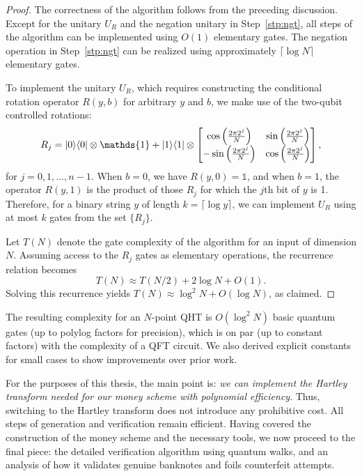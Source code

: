 \documentclass[12pt]{report}
\begin{document}
\begin{proof}
    The correctness of the algorithm follows from the preceding discussion. Except for the unitary \( U_R \) and the negation unitary in Step~\ref{stp:ngt}, all steps of the algorithm can be implemented using \( O(1) \) elementary gates. The negation operation in Step~\ref{stp:ngt} can be realized using approximately \( \lceil \log N \rceil \) elementary gates.
    
    To implement the unitary \( U_R \), which requires constructing the conditional rotation operator \( R(y, b) \) for arbitrary \( y \) and \( b \), we make use of the two-qubit controlled rotations:
    \[
    R_j = \ket{0}\bra{0} \otimes \mathds{1} + \ket{1}\bra{1} \otimes
    \begin{bmatrix}
    \cos\left(\frac{2\pi 2^j}{N}\right) & \sin\left(\frac{2\pi 2^j}{N}\right) \\
    -\sin\left(\frac{2\pi 2^j}{N}\right) & \cos\left(\frac{2\pi 2^j}{N}\right)
    \end{bmatrix},
    \]
    for \( j = 0, 1, \dots, n - 1 \). When \( b = 0 \), we have \( R(y, 0) = \mathds{1} \), and when \( b = 1 \), the operator \( R(y, 1) \) is the product of those \( R_j \) for which the \( j \)th bit of \( y \) is 1. Therefore, for a binary string \( y \) of length \( k = \lceil \log y \rceil \), we can implement \( U_R \) using at most \( k \) gates from the set \( \{R_j\} \).
    
    Let \( T(N) \) denote the gate complexity of the algorithm for an input of dimension \( N \). Assuming access to the \( R_j \) gates as elementary operations, the recurrence relation becomes
    \[
    T(N) \approx T(N / 2) + 2\log N + O(1).
    \]
    Solving this recurrence yields \( T(N) \approx \log^2 N + O(\log N) \), as claimed.
    \end{proof}


The resulting complexity for an $N$-point QHT is $O(\log^2 N)$ basic quantum gates (up to polylog factors for precision), which is on par (up to constant factors) with the complexity of a QFT circuit. We also derived explicit constants for small cases to show improvements over prior work.

For the purposes of this thesis, the main point is: \emph{we can implement the Hartley transform needed for our money scheme with polynomial efficiency}. Thus, switching to the Hartley transform does not introduce any prohibitive cost. All steps of generation and verification remain efficient. Having covered the construction of the money scheme and the necessary tools, we now proceed to the final piece: the detailed verification algorithm using quantum walks, and an analysis of how it validates genuine banknotes and foils counterfeit attempts.
\vspace{1em}
\end{document}
